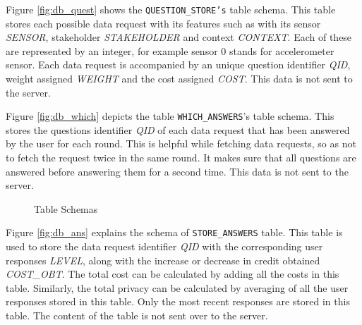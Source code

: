 Figure \ref{fig:db_quest} shows the \texttt{QUESTION\_STORE's} table schema. This table stores each possible data request with its features such as with its sensor \textit{SENSOR}, stakeholder \textit{STAKEHOLDER} and context \textit{CONTEXT}. Each of these are represented by an integer, for example sensor 0 stands for accelerometer sensor. Each data request is accompanied by
an unique question identifier \textit{QID}, weight assigned \textit{WEIGHT} and the cost assigned \textit{COST}. This data is not sent to 
the server.

Figure \ref{fig:db_which} depicts the table \texttt{WHICH\_ANSWERS}'s table schema. This stores the questions identifier \textit{QID} of each data request that has
been answered by the user for each round. This is helpful while fetching data requests, so as not to fetch the request twice in the same round. It makes sure that all questions are answered before answering them for a second time. This data is not sent to the server.

\begin{figure}[htp]
 \hspace{1em}
\caption{Table Schemas}
\label{fig:ts11}
\end{figure}

Figure \ref{fig:db_ans} explains the schema of \texttt{STORE\_ANSWERS} table. This table is used to store the data request identifier \textit{QID} with the corresponding
user responses \textit{LEVEL}, along with the increase or decrease in credit obtained \textit{COST\_OBT}. The total cost can be calculated by adding all the costs in this table. Similarly, the total privacy can be calculated by averaging of all the user responses stored in this table. Only the most recent responses are stored in this table. The content of the table is not sent over to the server.


